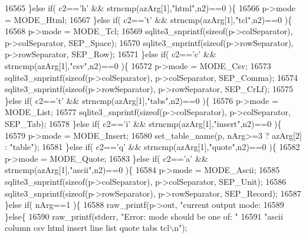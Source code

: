 \begin{DoxyCode}
{{{{{{{{{{{{{{{{{{{{{{{{{{{{{{{{{{{{{{{{{{{{{{{{{{{{{{{16565     \}\textcolor{keywordflow}{else} \textcolor{keywordflow}{if}( c2==\textcolor{charliteral}{'h'} && strncmp(azArg[1],\textcolor{stringliteral}{"html"},n2)==0 )\{
16566       p->mode = MODE_Html;
16567     \}\textcolor{keywordflow}{else} \textcolor{keywordflow}{if}( c2==\textcolor{charliteral}{'t'} && strncmp(azArg[1],\textcolor{stringliteral}{"tcl"},n2)==0 )\{
16568       p->mode = MODE_Tcl;
16569       sqlite3_snprintf(\textcolor{keyword}{sizeof}(p->colSeparator), p->colSeparator, SEP_Space);
16570       sqlite3_snprintf(\textcolor{keyword}{sizeof}(p->rowSeparator), p->rowSeparator, SEP_Row);
16571     \}\textcolor{keywordflow}{else} \textcolor{keywordflow}{if}( c2==\textcolor{charliteral}{'c'} && strncmp(azArg[1],\textcolor{stringliteral}{"csv"},n2)==0 )\{
16572       p->mode = MODE_Csv;
16573       sqlite3_snprintf(\textcolor{keyword}{sizeof}(p->colSeparator), p->colSeparator, SEP_Comma);
16574       sqlite3_snprintf(\textcolor{keyword}{sizeof}(p->rowSeparator), p->rowSeparator, SEP_CrLf);
16575     \}\textcolor{keywordflow}{else} \textcolor{keywordflow}{if}( c2==\textcolor{charliteral}{'t'} && strncmp(azArg[1],\textcolor{stringliteral}{"tabs"},n2)==0 )\{
16576       p->mode = MODE_List;
16577       sqlite3_snprintf(\textcolor{keyword}{sizeof}(p->colSeparator), p->colSeparator, SEP_Tab);
16578     \}\textcolor{keywordflow}{else} \textcolor{keywordflow}{if}( c2==\textcolor{charliteral}{'i'} && strncmp(azArg[1],\textcolor{stringliteral}{"insert"},n2)==0 )\{
16579       p->mode = MODE_Insert;
16580       set_table_name(p, nArg>=3 ? azArg[2] : \textcolor{stringliteral}{"table"});
16581     \}\textcolor{keywordflow}{else} \textcolor{keywordflow}{if}( c2==\textcolor{charliteral}{'q'} && strncmp(azArg[1],\textcolor{stringliteral}{"quote"},n2)==0 )\{
16582       p->mode = MODE_Quote;
16583     \}\textcolor{keywordflow}{else} \textcolor{keywordflow}{if}( c2==\textcolor{charliteral}{'a'} && strncmp(azArg[1],\textcolor{stringliteral}{"ascii"},n2)==0 )\{
16584       p->mode = MODE_Ascii;
16585       sqlite3_snprintf(\textcolor{keyword}{sizeof}(p->colSeparator), p->colSeparator, SEP_Unit);
16586       sqlite3_snprintf(\textcolor{keyword}{sizeof}(p->rowSeparator), p->rowSeparator, SEP_Record);
16587     \}\textcolor{keywordflow}{else} \textcolor{keywordflow}{if}( nArg==1 )\{
16588       raw_printf(p->out, \textcolor{stringliteral}{"current output mode: %
16589     \}\textcolor{keywordflow}{else}\{
16590       raw_printf(stderr, \textcolor{stringliteral}{"Error: mode should be one of: "}
16591          \textcolor{stringliteral}{"ascii column csv html insert line list quote tabs tcl\(\backslash\)n"});
}}}}}}}}}}}}}}}}}}}}}}}}}}}}}}}}}}}}}}}}}}}}}}}}}}}}}}}}
\end{DoxyCode}
